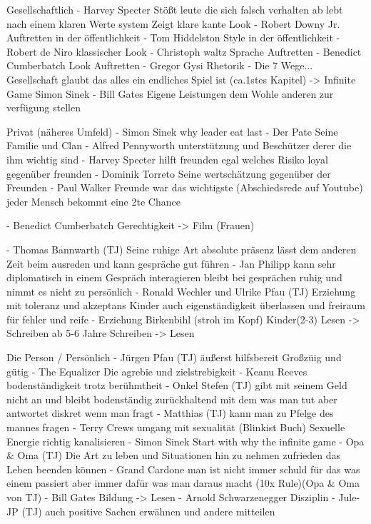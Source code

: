 Gesellschaftlich
    - Harvey Specter
        Stößt leute die sich falsch verhalten ab 
        lebt nach einem klaren Werte system 
        Zeigt klare kante 
        Look
    - Robert Downy Jr.
        Auftretten in der öffentlichkeit 
    - Tom Hiddelston
        Style in der öffentlichkeit
    - Robert de Niro
        klassischer Look
    - Christoph waltz 
        Sprache 
        Auftretten
    - Benedict Cumberbatch
        Look
        Auftretten
    - Gregor Gysi
        Rhetorik 
    - Die 7 Wege...
        Gesellschaft glaubt das alles ein endliches Spiel ist (ca.1stes Kapitel) -> Infinite Game Simon Sinek
    - Bill Gates
        Eigene Leistungen dem Wohle anderen zur verfügung stellen 
        

Privat (näheres Umfeld)
    - Simon Sinek 
        why leader eat last
    - Der Pate
        Seine Familie und Clan
    - Alfred Pennyworth
        unterstützung und Beschützer derer die ihm wichtig sind 
    - Harvey Specter
        hilft freunden egal welches Risiko
        loyal gegenüber freunden 
    - Dominik Torreto
        Seine wertschätzung gegenüber der Freunden
    - Paul Walker
        Freunde war das wichtigste (Abschiedsrede auf Youtube)
        jeder Mensch bekommt eine 2te Chance 

    - Benedict Cumberbatch
        Gerechtigkeit -> Film (Frauen)
   
    - Thomas Bannwarth (TJ)
        Seine ruhige Art
        absolute präsenz
        lässt dem anderen Zeit beim ausreden und kann gespräche gut führen 
    - Jan Philipp 
        kann sehr diplomatisch in einem Gespräch interagieren 
        bleibt bei gesprächen ruhig und nimmt es nicht zu persönlich 
    - Ronald Wechler und Ulrike Pfau (TJ)
        Erziehung mit toleranz und akzeptans
        Kinder auch eigenständigkeit überlassen und freiraum für fehler und reife
    - Erziehung 
        Birkenbihl (stroh im Kopf)
            Kinder(2-3) Lesen -> Schreiben
            ab 5-6 Jahre Schreiben -> Lesen
    

Die Person / Persönlich
    - Jürgen Pfau (TJ)
        äußerst hilfsbereit 
        Großzüig und gütig
    - The Equalizer
        Die agrebie und zielstrebigkeit 
    - Keanu Reeves 
        bodenständigkeit trotz berühmtheit
    - Onkel Stefen (TJ)
        gibt mit seinem Geld nicht an und bleibt bodenständig
        zurückhaltend mit dem was man tut aber antwortet diskret wenn man fragt
    - Matthias (TJ)
        kann man zu Pfelge des mannes fragen 
    - Terry Crews
        umgang mit sexualität 
    (Blinkist Buch) Sexuelle Energie richtig kanalisieren
    - Simon Sinek 
        Start with why 
        the infinite game
    - Opa & Oma (TJ)
        Die Art zu leben und Situationen hin zu nehmen
        zufrieden das Leben beenden können 
    - Grand Cardone
        man ist nicht immer schuld für das was einem passiert aber immer dafür was man daraus macht (10x Rule)(Opa & Oma von TJ)
    - Bill Gates 
        Bildung -> Lesen 
    - Arnold Schwarzenegger
        Disziplin 
    - Jule-JP (TJ)
        auch positive Sachen erwähnen und andere mitteilen 
